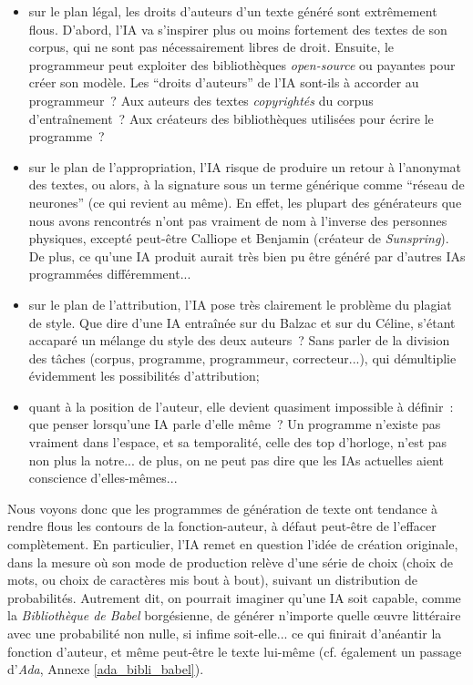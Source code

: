 \documentclass{article}
\begin{document}
					\begin{itemize}
						\item sur le plan légal, les droits d'auteurs d'un texte généré sont extrêmement flous. D'abord, l'IA va s'inspirer plus ou moins fortement des textes de son corpus, qui ne sont pas nécessairement libres de droit. Ensuite, le programmeur peut exploiter des bibliothèques \textit{open-source} ou payantes pour créer son modèle. Les ``droits d'auteurs'' de l'IA sont-ils à accorder au programmeur~? Aux auteurs des textes \textit{copyrightés} du corpus d'entraînement~? Aux créateurs des bibliothèques utilisées pour écrire le programme~?
						\item sur le plan de l'appropriation, l'IA risque de produire un retour à l'anonymat des textes, ou alors, à la signature sous un terme générique comme ``réseau de neurones'' (ce qui revient au même). En effet, les plupart des générateurs que nous avons rencontrés n'ont pas vraiment de nom à l'inverse des personnes physiques, excepté peut-être Calliope et Benjamin (créateur de \textit{Sunspring}). De plus, ce qu'une IA produit aurait très bien pu être généré par d'autres IAs programmées différemment...
						\item sur le plan de l'attribution, l'IA pose très clairement le problème du plagiat de style. Que dire d'une IA entraînée sur du Balzac et sur du Céline, s'étant accaparé un mélange du style des deux auteurs~? Sans parler de la division des tâches (corpus, programme, programmeur, correcteur...), qui démultiplie évidemment les possibilités d'attribution;
						\item quant à la position de l'auteur, elle devient quasiment impossible à définir~: que penser lorsqu'une IA parle d'elle même~? Un programme n'existe pas vraiment dans l'espace, et sa temporalité, celle des top d'horloge, n'est pas non plus la notre... de plus, on ne peut pas dire que les IAs actuelles aient conscience d'elles-mêmes...
					\end{itemize}
					Nous voyons donc que les programmes de génération de texte ont tendance à rendre flous les contours de la fonction-auteur, à défaut peut-être de l'effacer complètement. En particulier, l'IA remet en question l'idée de création originale, dans la mesure où son mode de production relève d'une série de choix (choix de mots, ou choix de caractères mis bout à bout), suivant un distribution de probabilités. Autrement dit, on pourrait imaginer qu'une IA soit capable, comme la \textit{Bibliothèque de Babel} borgésienne, de générer n'importe quelle œuvre littéraire avec une probabilité non nulle, si infime soit-elle... ce qui finirait d'anéantir la fonction d'auteur, et même peut-être le texte lui-même (cf. également un passage d'\textit{Ada}, Annexe \ref{ada_bibli_babel}).
\end{document}
